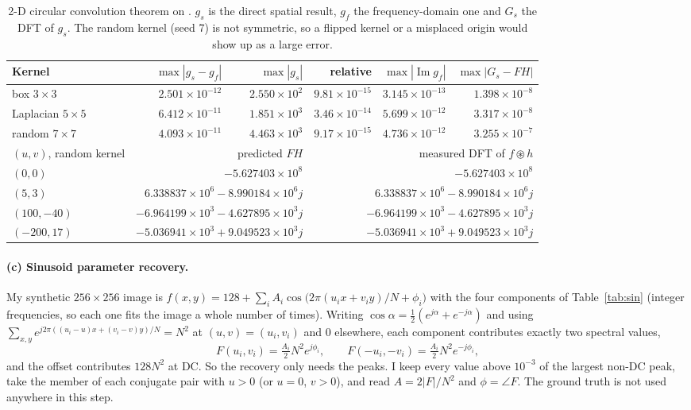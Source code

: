 \begin{table}[H]
\centering
\begin{tabular}{lrrrrr}
\toprule
Kernel & $\max|g_s-g_f|$ & $\max|g_s|$ & relative & $\max|\operatorname{Im} g_f|$ & $\max|G_s-FH|$\\
\midrule
box $3\times3$ & $2.501\times10^{-12}$ & $2.550\times10^{2}$ & $9.81\times10^{-15}$ & $3.145\times10^{-13}$ & $1.398\times10^{-8}$\\
Laplacian $5\times5$ & $6.412\times10^{-11}$ & $1.851\times10^{3}$ & $3.46\times10^{-14}$ & $5.699\times10^{-12}$ & $3.317\times10^{-8}$\\
random $7\times7$ & $4.093\times10^{-11}$ & $4.463\times10^{3}$ & $9.17\times10^{-15}$ & $4.736\times10^{-12}$ & $3.255\times10^{-7}$\\
\midrule
$(u,v)$, random kernel & \multicolumn{2}{r}{predicted $F H$} & \multicolumn{3}{r}{measured DFT of $f\circledast h$}\\
\midrule
$(0,0)$ & \multicolumn{2}{r}{$-5.627403\times10^{8}$} & \multicolumn{3}{r}{$-5.627403\times10^{8}$}\\
$(5,3)$ & \multicolumn{2}{r}{$6.338837\times10^{6}-8.990184\times10^{6}j$} & \multicolumn{3}{r}{$6.338837\times10^{6}-8.990184\times10^{6}j$}\\
$(100,-40)$ & \multicolumn{2}{r}{$-6.964199\times10^{3}-4.627895\times10^{3}j$} & \multicolumn{3}{r}{$-6.964199\times10^{3}-4.627895\times10^{3}j$}\\
$(-200,17)$ & \multicolumn{2}{r}{$-5.036941\times10^{3}+9.049523\times10^{3}j$} & \multicolumn{3}{r}{$-5.036941\times10^{3}+9.049523\times10^{3}j$}\\
\bottomrule
\end{tabular}
\caption{2-D circular convolution theorem on . $g_s$ is the direct
spatial result, $g_f$ the frequency-domain one and $G_s$ the DFT of $g_s$. The
random kernel (seed 7) is not symmetric, so a flipped kernel or a misplaced
origin would show up as a large error.}
\label{tab:conv}
\end{table}

\paragraph{(c) Sinusoid parameter recovery.} My synthetic $256\times256$ image
is $f(x,y)=128+\sum_i A_i\cos\big(2\pi(u_ix+v_iy)/N+\phi_i\big)$ with the four
components of Table~\ref{tab:sin} (integer frequencies, so each one fits the
image a whole number of times). Writing
$\cos\alpha=\tfrac12(e^{j\alpha}+e^{-j\alpha})$ and using
$\sum_{x,y}e^{j2\pi((u_i-u)x+(v_i-v)y)/N}=N^2$ at $(u,v)=(u_i,v_i)$ and $0$
elsewhere, each component contributes exactly two spectral values,
\begin{equation}
F(u_i,v_i)=\tfrac{A_i}{2}N^2e^{j\phi_i},\qquad F(-u_i,-v_i)=\tfrac{A_i}{2}N^2e^{-j\phi_i},
\end{equation}
and the offset contributes $128N^2$ at DC. So the recovery only needs the
peaks. I keep every value above $10^{-3}$ of the largest non-DC peak, take the
member of each conjugate pair with $u>0$ (or $u=0$, $v>0$), and read
$A=2|F|/N^2$ and $\phi=\angle F$. The ground truth is not used anywhere in this
step.

